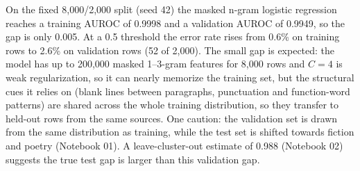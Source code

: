 
On the fixed 8{,}000/2{,}000 split (seed 42) the masked n-gram logistic regression reaches a training AUROC of 0.9998 and a validation AUROC of 0.9949, so the gap is only 0.005. At a 0.5 threshold the error rate rises from 0.6\% on training rows to 2.6\% on validation rows (52 of 2{,}000). The small gap is expected: the model has up to 200{,}000 masked 1--3-gram features for 8{,}000 rows and $C=4$ is weak regularization, so it can nearly memorize the training set, but the structural cues it relies on (blank lines between paragraphs, punctuation and function-word patterns) are shared across the whole training distribution, so they transfer to held-out rows from the same sources. One caution: the validation set is drawn from the same distribution as training, while the test set is shifted towards fiction and poetry (Notebook 01). A leave-cluster-out estimate of 0.988 (Notebook 02) suggests the true test gap is larger than this validation gap.

